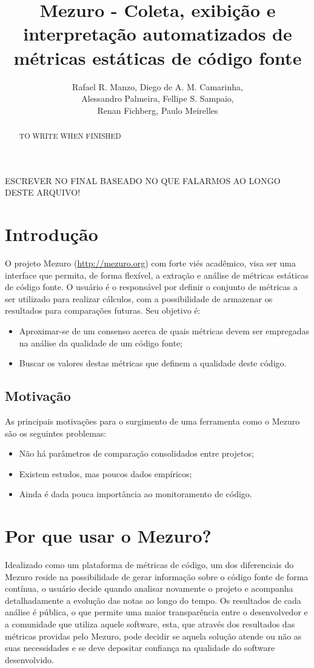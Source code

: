 \documentclass[12pt]{article}
\title{Mezuro - Coleta, exibição e interpretação automatizados de métricas estáticas de código fonte}
\author{Rafael R. Manzo\inst{1}, Diego de A. M. Camarinha\inst{1},\\
        Alessandro Palmeira\inst{1}, Fellipe S. Sampaio\inst{1},\\
        Renan Fichberg\inst{1}, Paulo Meirelles\inst{2}}
\begin{document}
\maketitle

\begin{abstract}
  TO WRITE WHEN FINISHED
\end{abstract}

\begin{resumo}
  ESCREVER NO FINAL BASEADO NO QUE FALARMOS AO LONGO DESTE ARQUIVO!
\end{resumo}

\section{Introdução} \label{sec:intro}
O projeto Mezuro (\url{http://mezuro.org}) com forte viés acadêmico, visa ser uma interface que permita, de forma flexível, a extração e análise de métricas estáticas de código fonte. O usuário é o responsável por definir o conjunto de métricas a ser utilizado para realizar cálculos, com a possibilidade de armazenar os resultados para comparações futuras. Seu objetivo é:

\begin{itemize}
    \item Aproximar-se de um consenso acerca de quais métricas devem ser empregadas na análise da qualidade de um código fonte;
    \item Buscar os valores destas métricas que definem a qualidade deste código.
\end{itemize}

\subsection{Motivação} \label{subsec:motivacao}
As principais motivações para o surgimento de uma ferramenta como o Mezuro são os seguintes problemas:

\begin{itemize}
    \item Não há parâmetros de comparação consolidados entre projetos;
    \item Existem estudos, mas poucos dados empíricos;
    \item Ainda é dada pouca importância ao monitoramento de código.
\end{itemize}

\section{Por que usar o Mezuro?} \label{sec:projeto-mezuro}
Idealizado como um plataforma de métricas de código, um dos diferenciais do Mezuro reside na possibilidade de gerar informação sobre o código fonte de forma contínua, o usuário decide quando analisar novamente o projeto e acompanha detalhadamente a evolução  das notas ao longo do tempo. Os resultados de cada análise é pública, o que permite uma maior transparência entre o desenvolvedor e a comunidade que utiliza aquele software, esta, que através dos resultados das métricas providas pelo Mezuro, pode decidir se aquela solução atende ou não as suas necessidades e se deve depositar confiança na qualidade do software desenvolvido.
\end{document}

